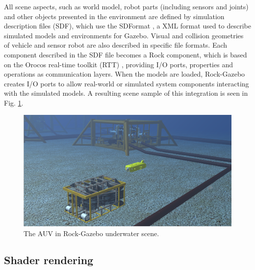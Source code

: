 \documentclass[final,5p,times]{elsarticle}
\begin{document}
All scene aspects, such as world model, robot parts (including sensors and
joints) and other objects presented in the environment are defined by simulation description files (SDF), which use the SDFormat \cite{sdformat2017}, a XML format used to describe simulated models and environments for Gazebo. Visual and collision geometries of vehicle and sensor robot are also described in specific file formats. Each component described in the SDF file becomes a Rock component, which is based on the Orocos real-time toolkit (RTT) \cite{soetens2005}, providing I/O ports, properties and operations as communication layers. When the models are loaded, Rock-Gazebo creates I/O ports to allow real-world or simulated system components interacting with the simulated models. A resulting scene sample of this integration is seen in Fig. \ref{fig:uwscene}.

\begin{figure}[t]
    \includegraphics[width=\columnwidth]{figs/uwscene}
    \centering
    \captionsetup{justification=justified}
    \caption{The AUV in Rock-Gazebo underwater scene.}
    \label{fig:uwscene}
\end{figure}


\subsection{Shader rendering}
\label{dev:shader}
\end{document}
